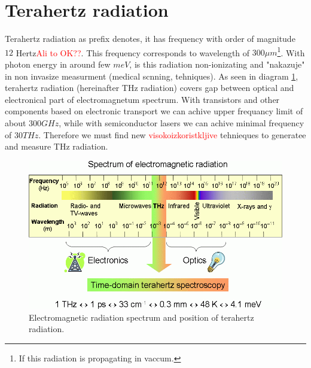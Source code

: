 \documentclass[english,11pt,a4paper]{article}
\numberwithin{equation}{section} %
\numberwithin{figure}{section} %
\numberwithin{table}{section} %
\begin{document}
\section{Terahertz radiation}
Terahertz radiation as prefix denotes, it has frequency with order of magnitude $12$ Hertz\textcolor{red}{Ali to OK??}. This frequency corresponds to wavelength of $300\mu m$\footnote{If this radiation is propagating in vaccum.}. With photon energy in around few $meV$, is this radiation non-ionizating and "nakazuje" in non invasize measurment (medical scnning, tehniques). As seen in diagram \ref{em-spectrum}, terahertz radiation (hereinafter THz radiation) covers gap between optical and electronical part of electromagnetum spectrum. With transistors and other components based on electronic transport we can achive upper frequancy limit of about $300GHz$, while with semiconductor lasers we can achive minimal frequency of $30THz$. Therefore we must find new \textcolor{red}{visokoizkoristkljive} tehnieques to generatee and measure THz radiation.


 
 
 
\begin{figure}[!htb]
\label{em-spectrum}
\centering
\includegraphics[scale=0.5]{slike/spectrum_b.png}
\caption{Electromagnetic radiation spectrum and position of terahertz radiation. \cite{em-spectrum}}
\end{figure}
\end{document}
